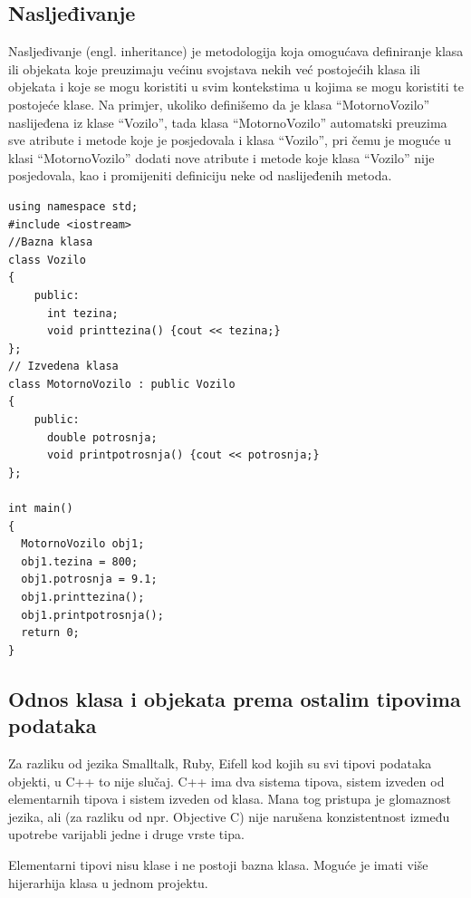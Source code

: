\documentclass[11pt]{book}
\begin{document}
\subsection{Nasljeđivanje}
Nasljeđivanje (engl.  inheritance) je metodologija koja omogućava definiranje klasa ili objekata koje preuzimaju većinu svojstava nekih već postojećih klasa ili objekata i koje se mogu koristiti u svim kontekstima u kojima se mogu koristiti te postojeće klase. Na primjer, ukoliko definišemo da je klasa “MotornoVozilo” naslijeđena iz klase “Vozilo”, tada klasa “MotornoVozilo” automatski preuzima sve atribute i metode koje je posjedovala i klasa “Vozilo”, pri čemu je moguće u klasi “MotornoVozilo” dodati nove atribute i metode koje klasa “Vozilo” nije posjedovala, kao i promijeniti definiciju neke od naslijeđenih metoda.

\begin{lstlisting}
using namespace std; 
#include <iostream>
//Bazna klasa
class Vozilo
{ 
    public: 
      int tezina; 
      void printtezina() {cout << tezina;}
}; 
// Izvedena klasa
class MotornoVozilo : public Vozilo 
{ 
    public: 
      double potrosnja; 
      void printpotrosnja() {cout << potrosnja;}
}; 
  
int main()  
{ 
  MotornoVozilo obj1; 
  obj1.tezina = 800; 
  obj1.potrosnja = 9.1; 
  obj1.printtezina();
  obj1.printpotrosnja();
  return 0; 
}  
\end{lstlisting}


\subsection{Odnos klasa i objekata prema ostalim tipovima podataka}
Za razliku od jezika Smalltalk, Ruby, Eifell kod kojih su svi tipovi podataka objekti, u C++ to nije slučaj. C++ ima dva sistema tipova, sistem izveden od elementarnih tipova i sistem izveden od klasa. Mana tog pristupa je glomaznost jezika, ali (za razliku od npr. Objective C) nije narušena konzistentnost između upotrebe varijabli jedne i druge vrste tipa.

Elementarni tipovi nisu klase i ne postoji bazna klasa. Moguće je imati više hijerarhija klasa u jednom projektu.
\end{document}
